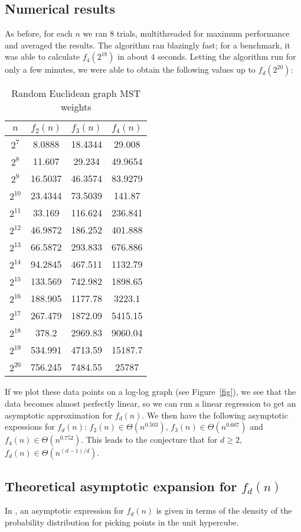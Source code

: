 \documentclass[a4paper, 10pt, twocolumn, twoside]{article}
\begin{document}
\subsection{Numerical results}
As before, for each $n$ we ran $8$ trials, multithreaded for maximum performance and averaged the results. The algorithm ran blazingly fast; for a benchmark, it was able to calculate $f_4(2^{18})$ in about $4$ seconds. Letting the algorithm run for only a few minutes, we were able to obtain the following values up to $f_d(2^{20})$:

\renewcommand{\arraystretch}{1.5}
\begin{table}[htbp]
\centering
\caption{Random Euclidean graph MST weights}
\begin{tabular}{||c|c|c|c||}
\hline
$n$ & $f_2(n)$ & $f_3(n)$ & $f_4(n)$ \\
\hline
$2^{7}$& 8.0888&	18.4344&	29.008\\
$2^{8}$&11.607& 29.234& 49.9654\\
$2^{9}$&16.5037&	46.3574&	83.9279\\
$2^{10}$&23.4344&	73.5039&	141.87\\
$2^{11}$&33.169& 116.624& 236.841\\
$2^{12}$&46.9872&	186.252&	401.888\\
$2^{13}$&66.5872&	293.833&	676.886\\
$2^{14}$&94.2845&	467.511&	1132.79\\
$2^{15}$&133.569& 742.982&	1898.65\\
$2^{16}$&188.905&	1177.78&	3223.1\\
$2^{17}$&267.479&	1872.09&	5415.15\\
$2^{18}$&378.2& 2969.83& 9060.04\\
$2^{19}$&534.991&	4713.59&	15187.7\\
$2^{20}$&756.245&	7484.55&	25787\\
\hline
\end{tabular}
\end{table}

If we plot these data points on a log-log graph (see Figure~\ref{fig}), we see that the data becomes almost perfectly linear, so we can run a linear regression to get an asymptotic approximation for $f_d(n)$. We then have the following asymptotic expessions for $f_d(n)$: $f_2(n)\in\Theta(n^{0.503})$, $f_3(n)\in \Theta(n^{0.667})$ and $f_4(n)\in \Theta(n^{0.752})$. This leads to the conjecture that for $d\geq 2$, $f_d(n)\in \Theta(n^{(d-1)/d})$. 

\subsection{Theoretical asymptotic expansion for $f_d(n)$}
In \cite{St1988}, an asymptotic expression for $f_d(n)$ is given in terms of the density of the probability distribution for picking points in the unit hypercube.
\end{document}
